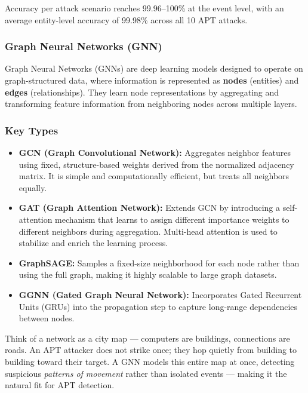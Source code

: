 Accuracy per attack scenario reaches 99.96--100\% at the event level, with an average entity-level accuracy of 99.98\% across all 10 APT attacks.

\subsubsection{Graph Neural Networks (GNN)}


Graph Neural Networks (GNNs) are deep learning models designed to operate on
graph-structured data, where information is represented as \textbf{nodes}
(entities) and \textbf{edges} (relationships). They learn node representations
by aggregating and transforming feature information from neighboring nodes
across multiple layers.

\subsubsection{Key Types}

\begin{itemize}
    \item \textbf{GCN (Graph Convolutional Network):} Aggregates neighbor
    features using fixed, structure-based weights derived from the normalized
    adjacency matrix. It is simple and computationally efficient, but treats
    all neighbors equally.

    \item \textbf{GAT (Graph Attention Network):} Extends GCN by introducing
    a self-attention mechanism that learns to assign different importance
    weights to different neighbors during aggregation. Multi-head attention
    is used to stabilize and enrich the learning process.

    \item \textbf{GraphSAGE:} Samples a fixed-size neighborhood for each node
    rather than using the full graph, making it highly scalable to large
    graph datasets.

    \item \textbf{GGNN (Gated Graph Neural Network):} Incorporates Gated
    Recurrent Units (GRUs) into the propagation step to capture long-range
    dependencies between nodes.
\end{itemize}

Think of a network as a city map --- computers are buildings, connections are roads. An APT attacker does not strike once; they hop quietly from building to building toward their target. A GNN models this entire map at once, detecting suspicious \textit{patterns of movement} rather than isolated events --- making it the natural fit for APT detection.

